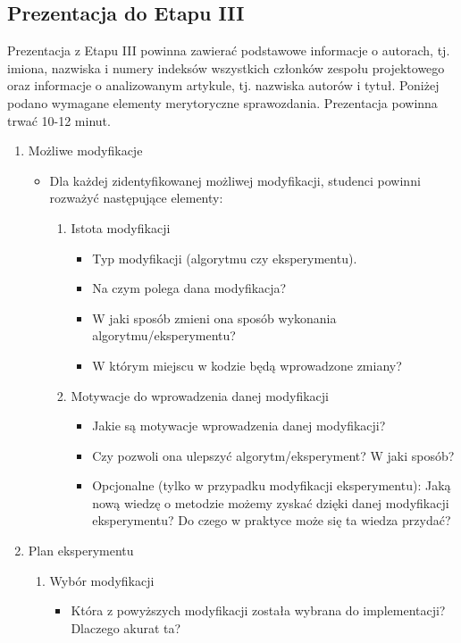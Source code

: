 \documentclass[a4paper,onecolumn]{LTJournalArticle}
\begin{document}
	\subsection{Prezentacja do Etapu III}
	Prezentacja z Etapu III powinna zawierać podstawowe informacje 
	o autorach, tj. imiona, nazwiska i numery indeksów wszystkich członków zespołu 
	projektowego oraz informacje o analizowanym artykule, tj. nazwiska autorów i 
	tytuł. 
	Poniżej podano wymagane elementy merytoryczne sprawozdania.
	Prezentacja powinna trwać 10-12 minut.
	\begin{enumerate}
		\item Możliwe modyfikacje
		\begin{itemize}
			\item Dla każdej zidentyfikowanej możliwej modyfikacji, studenci powinni rozważyć następujące elementy:
			\begin{enumerate}
				\item Istota modyfikacji
				\begin{itemize}
					\item Typ modyfikacji (algorytmu czy eksperymentu).
					\item Na czym polega dana modyfikacja?
					\item W jaki sposób zmieni ona sposób wykonania algorytmu/eksperymentu?
					\item W którym miejscu w kodzie będą wprowadzone zmiany?
				\end{itemize}
				\item Motywacje do wprowadzenia danej modyfikacji
				\begin{itemize}
					\item Jakie są motywacje wprowadzenia danej modyfikacji?
					\item Czy pozwoli ona ulepszyć algorytm/eksperyment? W jaki sposób?
					\item Opcjonalne (tylko w przypadku modyfikacji eksperymentu): Jaką nową wiedzę o metodzie możemy zyskać dzięki danej modyfikacji eksperymentu? Do czego w praktyce może się ta wiedza przydać?
				\end{itemize}
			\end{enumerate}
		\end{itemize}
		\item Plan eksperymentu
		\begin{enumerate}
			\item Wybór modyfikacji
			\begin{itemize}
				\item Która z powyższych modyfikacji została wybrana do implementacji? Dlaczego akurat ta?

\end{itemize}
\end{enumerate}
\end{enumerate}
\end{document}
